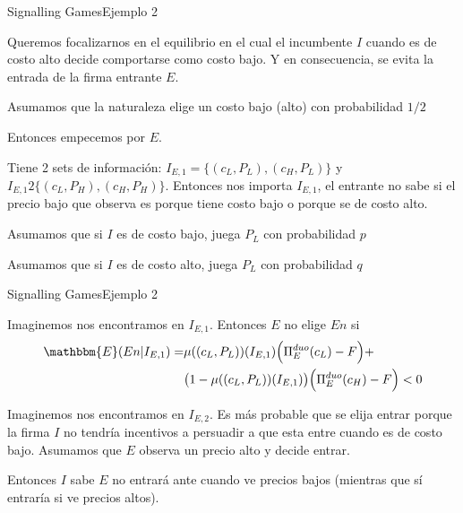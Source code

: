 \documentclass[notes, 11pt]{beamer} %
\newenvironment{wideitemize}{\itemize\addtolength{\itemsep}{10pt}}{\enditemize}
\begin{document}
\begin{frame}{Signalling Games}{Ejemplo 2}
\begin{wideitemize}
	\item<1-> Queremos focalizarnos en el equilibrio en el cual el incumbente $I$ cuando es de costo alto decide comportarse como costo bajo. Y en consecuencia, se evita la entrada de la firma entrante $E$.
	\item<2-> Asumamos que la naturaleza elige un costo bajo (alto) con probabilidad $1/2$
	\item<3-> Entonces empecemos por $E$.
	\begin{wideitemize}
		\item<4->[--] Tiene 2 sets de informaci\'on: $I_{E,1} = \{ (c_{L}, P_{L}), (c_{H}, P_{L}) \}$ y $I_{E,1} 2 \{ (c_{L}, P_{H}), (c_{H}, P_{H}) \}$. Entonces nos importa $I_{E,1}$, el entrante no sabe si el precio bajo que observa es porque tiene costo bajo o porque se de costo alto.
		\item<5->[--] Asumamos que si $I$ es de costo bajo, juega $P_{L}$ con probabilidad $p$
		\item<6->[--] Asumamos que si $I$ es de costo alto, juega $P_{L}$ con probabilidad $q$
	\end{wideitemize}
\end{wideitemize}
\end{frame}

\begin{frame}{Signalling Games}{Ejemplo 2}
	\begin{wideitemize}
		\item<1-> Imaginemos nos encontramos en $I_{E,1}$. Entonces $E$ no elige $En$ si
		\begin{align*}
			\mathbbm{E}(En | I_{E,1}) = & \mu( (c_{L}, P_{L}) )(I_{E,1}) \Big( \Pi_{E}^{duo}(c_{L})-F \Big) + \\
			& \big( 1 - \mu( (c_{L}, P_{L}) )(I_{E,1}) \big) \Big( \Pi_{E}^{duo}(c_{H})-F \Big) < 0
		\end{align*}
		\item<2-> Imaginemos nos encontramos en $I_{E,2}$. Es m\'as probable que se elija entrar porque la firma $I$ no tendr\'ia incentivos a persuadir a que esta entre cuando es de costo bajo. Asumamos que $E$ observa un precio alto y decide entrar.
		\item<3-> Entonces $I$ sabe $E$ no entrar\'a ante cuando ve precios bajos (mientras que s\'i entrar\'ia si ve precios altos).
	\end{wideitemize}
\end{frame}
\end{document}
